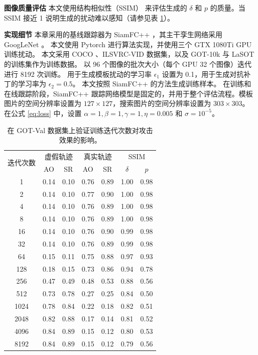 \textbf{图像质量评估} 本文使用结构相似性（SSIM）\cite{SSIM} 来评估生成的 $\delta$ 和 $p$ 的质量。当 SSIM 接近 1 说明生成的扰动难以感知（请参见表 \ref{tab:attack_iter}）。

\textbf{实现细节} 本章采用的基线跟踪器为 SiamFC++ \cite{SiamFC++}，其主干孪生网络采用 GoogLeNet \cite{GoogLeNet}。
本文使用 Pytorch 进行算法实现，并使用三个 GTX 1080Ti GPU 训练扰动。
本文采用 COCO \cite{COCO}、ILSVRC-VID \cite{VID} 数据集，以及 GOT-10k \cite{GOT-10k} 与 LaSOT \cite{LaSOT} 的训练集作为训练数据。
以 96 个图像的批次大小（每个 GPU 32 个图像）迭代进行 8192 次训练。
用于生成模板扰动的学习率 $\epsilon_1$ 设置为 0.1，用于生成对抗补丁的学习率为 $\epsilon_2 = 0.5$。
本文按照 SiamFC++ 的方法生成训练样本。
在训练和在线跟踪阶段，SiamFC++ 跟踪网络模型是固定的，并用于整个评估流程。模板图片的空间分辨率设置为 $127\times 127$，搜索图片的空间分辨率设置为 $303\times 303$。
在公式 \ref{eq:loss} 中，设置 $\alpha=1, \beta=1, \gamma=1, \eta=0.005$ 和 $\sigma=10^{-5}$。

\begin{table}[t!]
\centering
\caption{在 GOT-Val 数据集上验证训练迭代次数对攻击效果的影响。}
\begin{tabular}{@{}ccccccc@{}}
\toprule
\multirow{2}{*}{迭代次数} & \multicolumn{2}{c}{虚假轨迹} & \multicolumn{2}{c}{真实轨迹} & \multicolumn{2}{c}{SSIM}\\ \cmidrule(lr){2-3} \cmidrule(lr){4-5} \cmidrule(lr){6-7}
 & \multicolumn{1}{c}{AO} & \multicolumn{1}{c}{SR} & \multicolumn{1}{c}{AO} & \multicolumn{1}{c}{SR} & $\delta$ & $p$  \\ \midrule
1    & 0.14 & 0.10 & 0.76 & 0.89 & 1.00 & 0.98\\
2    & 0.14 & 0.10 & 0.77 & 0.90 & 1.00 & 0.98\\
4    & 0.14 & 0.10 & 0.76 & 0.89 & 1.00 & 0.98\\
8    & 0.14 & 0.10 & 0.76 & 0.89 & 1.00 & 0.98\\
16   & 0.14 & 0.10 & 0.76 & 0.90 & 0.99 & 0.98\\
32   & 0.14 & 0.10 & 0.76 & 0.89 & 0.99 & 0.98\\
64   & 0.15 & 0.11 & 0.75 & 0.88 & 0.97 & 0.93\\
128  & 0.18 & 0.15 & 0.73 & 0.86 & 0.94 & 0.78\\
256  & 0.47 & 0.49 & 0.48 & 0.53 & 0.88 & 0.56\\
512  & 0.73 & 0.78 & 0.27 & 0.25 & 0.84 & 0.50\\
1024 & 0.78 & 0.84 & 0.22 & 0.18 & 0.82 & 0.51\\
2048 & 0.82 & 0.88 & 0.17 & 0.14 & 0.81 & 0.52\\
4096 & 0.84 & 0.89 & 0.15 & 0.12 & 0.80 & 0.53\\
8192 & 0.84 & 0.89 & 0.15 & 0.12 & 0.79 & 0.56\\
\bottomrule
\end{tabular}
\label{tab:attack_iter}
\end{table}

